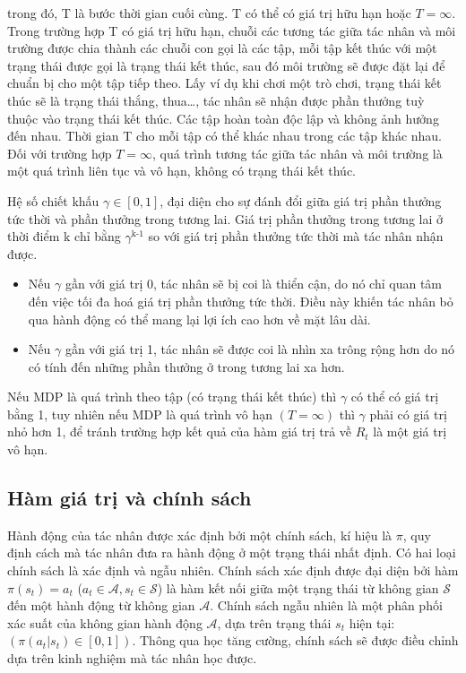 \documentclass{uetgraduation}
\begin{document}
trong đó, T là bước thời gian cuối cùng. T có thể có giá trị hữu hạn hoặc $T = \infty$. Trong trường hợp T có giá trị hữu hạn, chuỗi các tương tác giữa tác nhân và môi trường được chia thành các chuỗi
con gọi là các tập, mỗi tập kết thúc với một trạng thái được gọi là trạng thái kết thúc, sau đó môi trường sẽ được đặt lại để chuẩn bị cho một tập tiếp theo. Lấy ví dụ khi chơi một trò chơi, trạng thái
kết thúc sẽ là trạng thái thắng, thua\dots, tác nhân sẽ nhận được phần thưởng tuỳ thuộc vào trạng thái kết thúc. Các tập hoàn toàn độc lập và không ảnh hưởng đến nhau. Thời gian T cho mỗi tập có thể khác
nhau trong các tập khác nhau. Đối với trường hợp $T = \infty$, quá trình tương tác giữa tác nhân và môi trường là một quá trình liên tục và vô hạn, không có trạng thái kết thúc.

Hệ số chiết khấu $\gamma \in [0, 1]$, đại diện cho sự đánh đổi giữa giá trị phần thưởng tức thời và phần thưởng trong tương lai. Giá trị phần thưởng trong tương lai ở thời điểm k chỉ bằng $\gamma^\text{k-1}$
so với giá trị phần thưởng tức thời mà tác nhân nhận được.
\begin{itemize}
    \item Nếu $\gamma$ gần với giá trị 0, tác nhân sẽ bị coi là thiển cận, do nó chỉ quan tâm đến việc tối đa hoá giá trị phần thưởng tức thời. Điều này khiến tác nhân bỏ qua hành động có thể mang lại lợi ích 
    cao hơn về mặt lâu dài.
    \item Nếu $\gamma$ gần với giá trị 1, tác nhân sẽ được coi là nhìn xa trông rộng hơn do nó có tính đến những phần thưởng ở trong tương lai xa hơn.
\end{itemize}

Nếu MDP là quá trình theo tập (có trạng thái kết thúc) thì $\gamma$ có thể có giá trị bằng 1, tuy nhiên nếu MDP là quá trình vô hạn $(T = \infty)$ thì $\gamma$ phải có giá trị nhỏ hơn 1, để tránh trường
hợp kết quả của hàm giá trị trả về $R_t$ là một giá trị vô hạn.

\subsection{Hàm giá trị và chính sách}
Hành động của tác nhân được xác định bởi một chính sách, kí hiệu là $\pi$, quy định cách mà tác nhân đưa ra hành động ở một trạng thái nhất định. Có hai loại chính sách là xác định và ngẫu nhiên. Chính sách xác định được
đại diện bởi hàm $\pi(s_t) = a_t$ ($a_t \in \mathcal{A}, s_t \in \mathcal{S}$) là hàm kết nối giữa một trạng thái từ không gian $\mathcal{S}$ đến một hành động từ không gian $\mathcal{A}$. Chính sách
ngẫu nhiên là một phân phối xác suất của không gian hành động $\mathcal{A}$, dựa trên trạng thái $s_t$ hiện tại: $(\pi(a_t | s_t) \in [0, 1])$. Thông qua học tăng cường, chính sách sẽ được điều chỉnh
dựa trên kinh nghiệm mà tác nhân học được.
\end{document}
